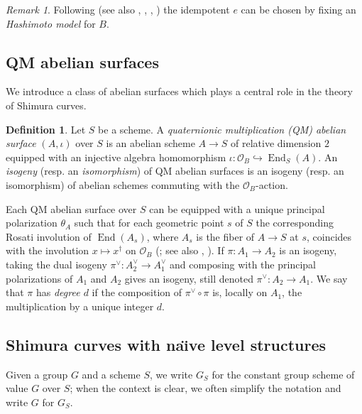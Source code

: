 \documentclass[a4paper,11pt]{amsart}
\numberwithin{equation}{section}
\theoremstyle{plain}
\theoremstyle{definition}
\newtheorem{definition}[theorem]{Definition}
\theoremstyle{remark}
\newtheorem{remark}[theorem]{Remark}
\DeclareMathOperator{\End}{End}
\begin{document}
\begin{remark}
Following \cite[(1.10)]{Mori} (see also \cite[Proposition 1.4]{Mori1}, \cite[\S2.3]{Burungale}, 
\cite[\S2.1]{Brooks}, \cite[\S2.1]{Longo-ShimuraMaass}) the idempotent $e$
can be chosen by fixing an \emph{Hashimoto model} for $B$. 
\end{remark}

\subsection{QM abelian surfaces}\label{sec-QMAS}
We introduce a class of abelian surfaces which plays a central role in the theory of Shimura curves. 

\begin{definition} 
Let $S$ be a scheme. A \emph{quaternionic multiplication (QM) abelian surface} $(A,\iota)$ over $S$ is an abelian scheme $A\rightarrow S$ of relative dimension $2$ equipped with an injective algebra homomorphism $\iota\colon\mathcal{O}_B\hookrightarrow\End_S(A)$. An \emph{isogeny} (resp. an \emph{isomorphism}) of QM abelian surfaces is an isogeny (resp. an isomorphism) of abelian schemes commuting with the $\mathcal{O}_B$-action. 
\end{definition}

Each QM abelian surface over $S$ can be equipped with a unique principal polarization $\theta_A$ such that for each geometric point $s$ of $S$ the corresponding Rosati involution of $\End(A_s)$, where $A_s$ is the fiber of $A\rightarrow S$ at $s$, coincides with the involution $x\mapsto x^\dagger$ on $\mathcal{O}_B$ (\cite[Lemma 1.1]{Milne}; see also \cite[Lemma 5]{DT}, \cite[\S1]{Buz}). If $\pi\colon A_1\rightarrow A_2$ is an isogeny, taking the dual isogeny $\pi^\vee\colon A_2^\vee\rightarrow A_1^\vee$ and composing with the principal polarizations of $A_1$ and $A_2$ gives an isogeny, still denoted  $\pi^\vee\colon A_2\rightarrow A_1$. We say that $\pi$ has \emph{degree $d$} if the composition of $\pi^\vee\circ\pi$ is, locally on $A_1$, the multiplication by a unique integer $d$.

\subsection{Shimura curves with na\"{\i}ve level structures} \label{shimura section} 
Given a group $G$ and a scheme $S$, we write $G_S$ for the constant group scheme of value $G$ over $S$; when the context is clear, we often simplify the notation and write $G$ for $G_S$. 
\end{document}
